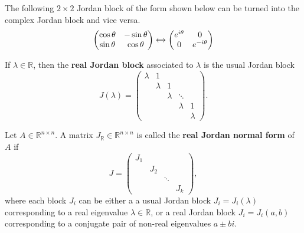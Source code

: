 	\begin{example}
	  \label{ex:rotation-in-r2}
    The following $2 \times 2$ Jordan block of the form shown below can be turned into the complex Jordan block and vice versa. 
		\begin{equation}
			\begin{pmatrix}
				\cos{\theta} & -\sin{\theta} \\
				\sin{\theta} & \cos{\theta} 
			\end{pmatrix} \xleftrightarrow{} \begin{pmatrix}
				e^{i \theta} & 0 \\
				0 & e^{- i \theta}
			\end{pmatrix}
		\end{equation}
  \end{example}

	\begin{definition}
	  \label{def:real-jordan-block-for-a-real-eigenvalue}
		If $\lambda \in \mathbb{R}$, then the \textbf{real Jordan block} associated to $\lambda$ is the usual Jordan block
		\begin{equation}
			J(\lambda) = \begin{pmatrix}
				\lambda & 1 &  &  & \\
				 & \lambda & 1 &  & \\
				 &  & \lambda & \ddots & \\
				 &  &  & \lambda & 1 \\
				 &  &  &  & \lambda
			\end{pmatrix}.
		\end{equation}
	\end{definition}

	\begin{definition}
	  \label{def:jordan-normal-form-over-r}
		Let $A \in \mathbb{R}^{n \times n}$. A matrix $J_{\mathbb{R}} \in \mathbb{R}^{n \times n}$ is called the \textbf{real Jordan normal form} of $A$ if
		\begin{equation}
			J = \begin{pmatrix}
				J_1 &  &  & \\
				 & J_2 &  & \\
				 &  & \ddots & \\
				 &  &  & J_k
			\end{pmatrix},
		\end{equation}
		where each block $J_i$ can be either a a usual Jordan block $J_i = J_i(\lambda)$ corresponding to a real eigenvalue $\lambda \in \mathbb{R}$, or a real Jordan block $J_i = J_i(a,b)$ corresponding to a conjugate pair of non-real eigenvalues $a \pm bi$.
	\end{definition}


